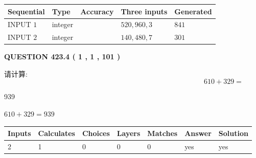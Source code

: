 \documentclass{ctexart}
\begin{document}
   
  
  
\noindent\begin{tabular}{|l|l|l|l|l|}
\hline
 Sequential & Type & Accuracy & Three inputs & Generated \\ 
\hline
 
 
  INPUT $  1 $ & integer &  & $
 520
 , 
 960
 , 
 3
 $ & $ 841 $ 
 \\  \hline  
 
 
  INPUT $  2 $ & integer &  & $
 140
 , 
 480
 , 
 7
 $ & $ 301 $ 
 \\  \hline  
 \end{tabular}
   
   
  
\vspace{0.2in}
  
{\textbf{\Large{QUESTION
423.4 
 ( 1 , 1 , 101 )
}}}
  
  
 
请计算:
\begin{equation}
610 +  %
329 = \nonumber
\end{equation}
 
 
 
\noindent{}
 
 

939
 
 
\noindent{}
 
 

 
 
 
\noindent{}
 
 

$ %
610 +  %
329=   %
939$
 
 
\noindent{}
 
 

 
   
   
   
   
\noindent\begin{tabular}{|l|l|l|l|l|l|l|}
 \hline
Inputs & Calculates & Choices & Layers & Matches & Answer & Solution \\ \hline
 2  & 
 1  & 
 0
  & 
 0  & 
 0  & 
  yes & 
  yes 
  \\ \hline
 \end{tabular}
   
\end{document}
